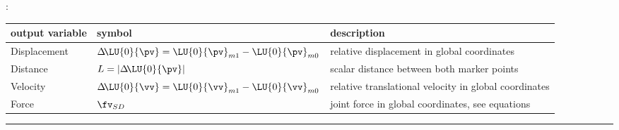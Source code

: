 :
\begin{center}
\footnotesize
\begin{longtable}{| p{5cm} | p{5cm} | p{6cm} |} 
\hline
\bf output variable & \bf symbol & \bf description \\ \hline
Displacement & $\Delta\! \LU{0}{\pv} = \LU{0}{\pv}_{m1} - \LU{0}{\pv}_{m0}$ & relative displacement in global coordinates\\ \hline
Distance & $L=|\Delta\! \LU{0}{\pv}|$ & scalar distance between both marker points\\ \hline
Velocity & $\Delta\! \LU{0}{\vv} = \LU{0}{\vv}_{m1} - \LU{0}{\vv}_{m0}$ & relative translational velocity in global coordinates\\ \hline
Force & $\fv_{SD}$ & joint force in global coordinates, see equations\\ \hline
\end{longtable}
\end{center}
\par\noindent\rule{\textwidth}{0.4pt}
\label{description_ObjectConnectorCartesianSpringDamper}
